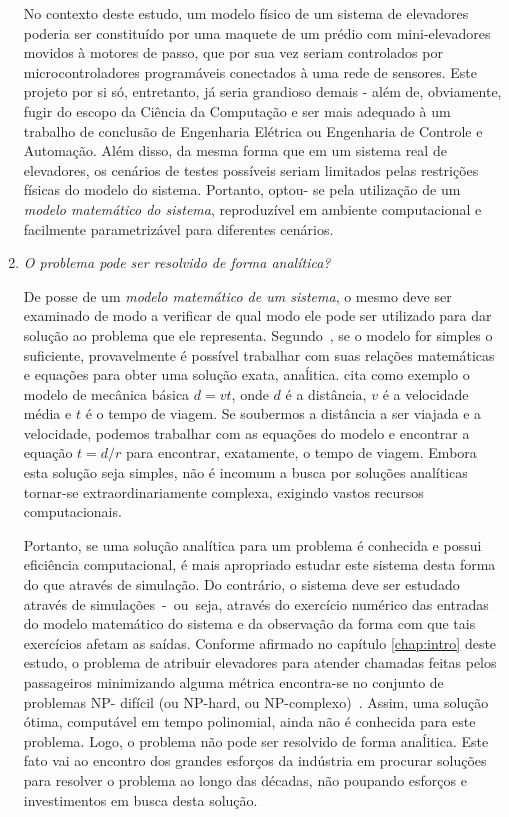 \begin{enumerate}
No contexto deste estudo, um modelo físico de um sistema de elevadores poderia
ser constituído por uma maquete de um prédio com mini-elevadores movidos à
motores de passo, que por sua vez seriam controlados por microcontroladores
programáveis conectados à uma rede de sensores. Este projeto por si só,
entretanto, já seria grandioso demais - além de, obviamente, fugir do escopo da
Ciência da Computação e ser mais adequado à um trabalho de conclusão de
Engenharia Elétrica ou Engenharia de Controle e Automação. Além disso, da mesma
forma que em um sistema real de elevadores, os cenários de testes possíveis
seriam limitados pelas restrições físicas do modelo do sistema. Portanto, optou-
se pela utilização de um \textit{modelo matemático do sistema}, reproduzível em
ambiente computacional e facilmente parametrizável para diferentes cenários.

\item \textit{O problema pode ser resolvido de forma analítica?}

De posse de um \textit{modelo matemático de um sistema}, o mesmo deve ser
examinado de modo a verificar de qual modo ele pode ser utilizado para dar
solução ao problema que ele representa. Segundo~\cite{Law}, se o modelo for
simples o suficiente, provavelmente é possível trabalhar com suas relações
matemáticas e equações para obter uma solução exata, anaĺitica. \cite{Law} cita
como exemplo o modelo de mecânica básica $d = vt$, onde $d$ é a distância, $v$ é
a velocidade média e $t$ é o tempo de viagem. Se soubermos a distância a ser
viajada e a velocidade, podemos trabalhar com as equações do modelo e encontrar
a equação $t = d/r$ para encontrar, exatamente, o tempo de viagem. Embora esta
solução seja simples, não é incomum a busca por soluções analíticas tornar-se
extraordinariamente complexa, exigindo vastos recursos computacionais.

Portanto, se uma solução analítica para um problema é conhecida e possui
eficiência computacional, é mais apropriado estudar este sistema desta forma do
que através de simulação. Do contrário, o sistema deve ser estudado através de
simulações~-~ou~seja, através do exercício numérico das entradas do modelo
matemático do sistema e da observação da forma com que tais exercícios afetam as
saídas. Conforme afirmado no capítulo \ref{chap:intro} deste estudo, o problema
de atribuir elevadores para atender chamadas feitas pelos passageiros
minimizando alguma métrica encontra-se no conjunto de problemas NP- difícil (ou
NP-hard, ou NP-complexo)~\cite{SeKo99}. Assim, uma solução ótima, computável em
tempo polinomial, ainda não é conhecida para este problema. Logo, o problema não
pode ser resolvido de forma anaĺitica. Este fato vai ao encontro dos grandes
esforços da indústria em procurar soluções para resolver o problema ao longo das
décadas, não poupando esforços e investimentos em busca desta solução.

\end{enumerate}

